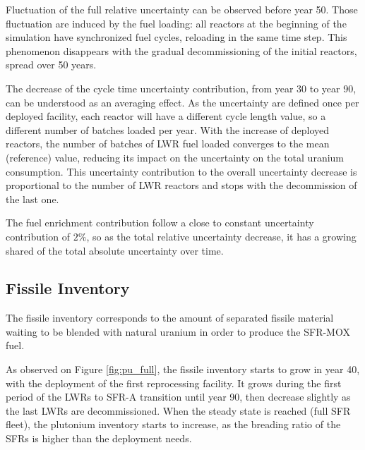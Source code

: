 \documentclass{anstrans}
\begin{document}
Fluctuation of the full relative uncertainty can be observed before year 50.
Those fluctuation are induced by the fuel loading: all reactors at the beginning
of the simulation have synchronized fuel cycles, reloading in the same time
step.  This phenomenon disappears with the gradual decommissioning of the
initial reactors, spread over 50 years.

The decrease of the cycle time uncertainty contribution, from year 30 to year
90, can be understood as an averaging effect.  As the uncertainty are defined
once per deployed facility, each reactor will have a different cycle length
value, so a different number of batches loaded per year.  With the increase of
deployed reactors, the number of batches of \gls{LWR} fuel loaded converges to
the mean (reference) value, reducing its impact on the uncertainty on the total uranium
consumption. This uncertainty contribution to the overall uncertainty decrease
is proportional to the number of \gls{LWR} reactors and stops with the
decommission of the last one.

The fuel enrichment contribution follow a close to constant uncertainty
contribution of $2\%$, so as the total relative uncertainty decrease, it has a
growing shared of the total absolute uncertainty over time.


\subsection{Fissile Inventory}

The fissile inventory corresponds to the amount of separated fissile material
waiting to be blended with natural uranium in order to produce the
\gls{SFR}-\gls{MOX} fuel.

As observed on Figure \ref{fig:pu_full}, the fissile inventory starts to grow in
year 40, with the deployment of the first reprocessing facility.  It grows
during the first period of the \glspl{LWR} to \gls{SFR}-A transition until year
90, then decrease slightly as the last \glspl{LWR} are decommissioned.  When the
steady state is reached (full \gls{SFR} fleet), the plutonium inventory starts
to increase, as the breading ratio of the \glspl{SFR} is higher than the
deployment needs.
\end{document}
